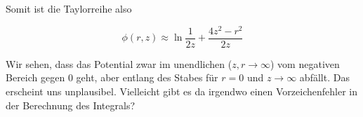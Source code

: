 \documentclass[a4paper,german,12pt,smallheadings]{scrartcl}
\begin{document}
\begin{enumerate}[a)]
    Somit ist die Taylorreihe also

    \begin{equation}
      \phi(r, z) \approx \ln \frac{1}{2z} + \frac{4z^2 - r^2}{2z}
    \end{equation}


    Wir sehen, dass das Potential zwar im unendlichen ($z,r \to \infty$) vom negativen Bereich
    gegen $0$ geht, aber entlang des Stabes für $r=0$ und $z \to \infty$
    abfällt. Das erscheint uns unplausibel. Vielleicht gibt es da irgendwo
    einen Vorzeichenfehler in der Berechnung des Integrals?


\end{enumerate}
\end{document}

